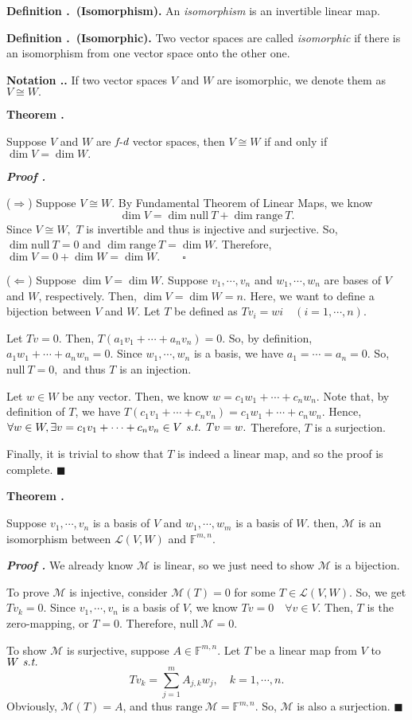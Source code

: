 \documentclass[11pt, letterpaper]{article}
\newcounter{index}[subsection]
\newenvironment*{df}[1]{\par\noindent\textbf{Definition \thesubsection.\stepcounter{index}\theindex\ (#1).}}{\par}
\newenvironment*{thm}[1]{\begin{tcolorbox}\par\noindent\textbf{Theorem \thesubsection.\stepcounter{index}\theindex\ #1} \par}{\par\end{tcolorbox}}
\newenvironment*{nota}{\par\noindent\textbf{Notation \thesubsection.\stepcounter{index}\theindex.}}{\par}
\newcounter{nprf}[subsection]
\newenvironment*{prf}{\par\indent\textbf{\textit{Proof \stepcounter{nprf}\thenprf.}}}{\hfill$\blacksquare$\par}
\def\dsst{\displaystyle}
\def\F{\mathbb{F}}
\def\L{\mathcal{L}}
\def\M{\mathcal{M}}
\def\st{\emph{ s.t. }}
\def\FD{\emph{f-d}}
\def\pqde{\qquad\square}
\def\Null{\mathrm{null\ }}
\def\range{\mathrm{range\ }}
\begin{document}
\begin{df}{Isomorphism}
	An \textit{isomorphism} is an invertible linear map. 	
\end{df}
\begin{df}{Isomorphic}
	Two vector spaces are called \textit{isomorphic} if there is an isomorphism from one vector space onto the other one.	
\end{df}
\begin{nota}
	If two vector spaces $V$ and $W$ are isomorphic, we denote them as $V\cong W.$	
\end{nota}
\begin{thm}{}
	Suppose $V$ and $W$ are $\FD$ vector spaces, then $V\cong W$ if and only if $\dim V=\dim W.$	
\end{thm}
\begin{prf}
	\par ($\Rightarrow$) Suppose $V\cong W.$ By Fundamental Theorem of Linear Maps, we know \[\dim V=\dim\Null T+\dim\range T.\] Since $V\cong W,$ $T$ is invertible and thus is injective and surjective. So, $\dim\Null T=0$ and $\dim\range T=\dim W.$ Therefore, $\dim V=0+\dim W=\dim W.\pqde$
	\par ($\Leftarrow$)	Suppose $\dim V=\dim W.$ Suppose $v_1,\cdots,v_n$ and $w_1,\cdots,w_n$ are bases of $V$ and $W$, respectively. Then, $\dim V=\dim W=n.$ Here, we want to define a bijection between $V$ and $W$. Let $T$ be defined as $Tv_i=wi\quad(i=1,\cdots,n).$\par 
	Let $Tv=0$. Then, $T(a_1v_1+\cdots+a_nv_n)=0$. So, by definition, $a_1w_1+\cdots+a_nw_n=0.$ Since $w_1,\cdots,w_n$ is a basis, we have $a_1=\cdots=a_n=0$. So, $\Null T=\qty{0},$ and thus $T$ is an injection.\par 
	Let $w\in W$ be any vector. Then, we know $w=c_1w_1+\cdots+c_nw_n$. Note that, by definition of $T$, we have $T(c_1v_1+\cdots+c_nv_n)=c_1w_1+\cdots+c_nw_n$. Hence, $\forall w\in W,\exists v=c_1v_1+\cdots+c_nv_n\in V\st Tv=w.$ Therefore, $T$ is a surjection.\par 
	Finally, it is trivial to show that $T$ is indeed a linear map, and so the proof is complete.
\end{prf}
\begin{thm}{}
	Suppose $v_1,\cdots,v_n$ is a basis of $V$ and $w_1,\cdots,w_m$ is a basis of $W$. then, $\M$ is an isomorphism between $\L(V,W)$ and $\F^{m,n}.$	
\end{thm}
\begin{prf}
	We already know $\M$ is linear, so we just need to show $\M$ is a bijection. \par 
	To prove $\M$ is injective, consider $\M(T)=0$ for some $T\in\L(V,W)$. So, we get $Tv_k=0$. Since $v_1,\cdots,v_n$ is a basis of $V$, we know $Tv=0\quad\forall v\in V$. Then, $T$ is the zero-mapping, or $T=0$. Therefore, $\Null\M=\qty{0}$.\par 
	To show $\M$ is surjective, suppose $A\in\F^{m,n}$. Let $T$ be a linear map from $V$ to $W\st$ \[Tv_k=\dsst\sum_{j=1}^mA_{j,k}w_j,\quad k=1,\cdots,n.\] Obviously, $\M(T)=A$, and thus $\range\M=\F^{m,n}$. So, $\M$ is also a surjection.
\end{prf}
\end{document}
